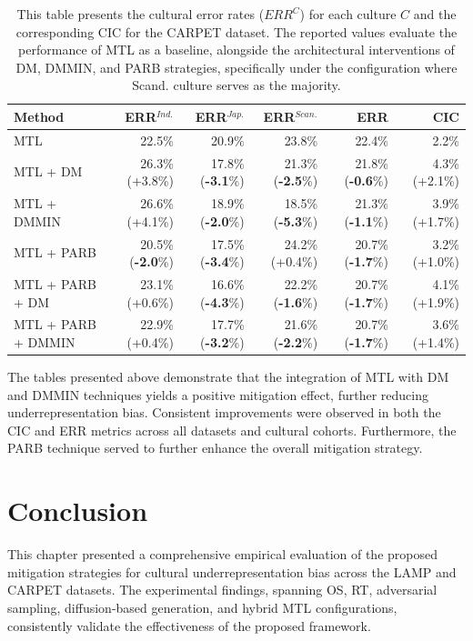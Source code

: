 \begin{table}
\centering
\scriptsize
\begin{tabular}{lrrrrr}
\toprule
\textbf{Method} & \textbf{ERR$^{Ind.}$} & \textbf{ERR$^{Jap.}$} & \textbf{ERR$^{Scan.}$} & \textbf{ERR} & \textbf{CIC} \\
\midrule
MTL & 22.5\% & 20.9\% & 23.8\% & 22.4\% & 2.2\% \\
MTL +  DM    & 26.3\% (+3.8\%) & 17.8\% (\textbf{-3.1}\%) & 21.3\% (\textbf{-2.5}\%) & 21.8\% (\textbf{-0.6}\%) & 4.3\% (+2.1\%) \\
MTL +  DMMIN & 26.6\% (+4.1\%) & 18.9\% (\textbf{-2.0}\%) & 18.5\% (\textbf{-5.3}\%) & 21.3\% (\textbf{-1.1}\%) & 3.9\% (+1.7\%) \\
\hline
MTL + PARB     & 20.5\% (\textbf{-2.0}\%) & 17.5\% (\textbf{-3.4}\%) & 24.2\% (+0.4\%) & 20.7\% (\textbf{-1.7}\%) & 3.2\% (+1.0\%) \\
MTL + PARB + DM & 23.1\% (+0.6\%) & 16.6\% (\textbf{-4.3}\%) & 22.2\% (\textbf{-1.6}\%) & 20.7\% (\textbf{-1.7}\%) & 4.1\% (+1.9\%) \\
MTL + PARB + DMMIN & 22.9\% (+0.4\%) & 17.7\% (\textbf{-3.2}\%) & 21.6\% (\textbf{-2.2}\%) & 20.7\% (\textbf{-1.7}\%) & 3.6\% (+1.4\%) \\
\bottomrule
\end{tabular}
\caption{This table presents the cultural error rates ($ERR^C$) for each culture $C$ and the corresponding CIC for the CARPET dataset. The reported values evaluate the performance of MTL as a baseline, alongside the architectural interventions of DM, DMMIN, and PARB strategies, specifically under the configuration where Scand. culture serves as the majority.}
\label{ch3:tab:mtl_and_da:CS}
\end{table}
%
The tables presented above demonstrate that the integration of MTL with DM and DMMIN techniques yields a positive mitigation effect, further reducing underrepresentation bias. Consistent improvements were observed in both the CIC and ERR metrics across all datasets and cultural cohorts. Furthermore, the PARB technique served to further enhance the overall mitigation strategy.

\section{Conclusion}

This chapter presented a comprehensive empirical evaluation of the proposed mitigation strategies for cultural underrepresentation bias across the LAMP and CARPET datasets. The experimental findings, spanning OS, RT, adversarial sampling, diffusion-based generation, and hybrid MTL configurations, consistently validate the effectiveness of the proposed framework.

